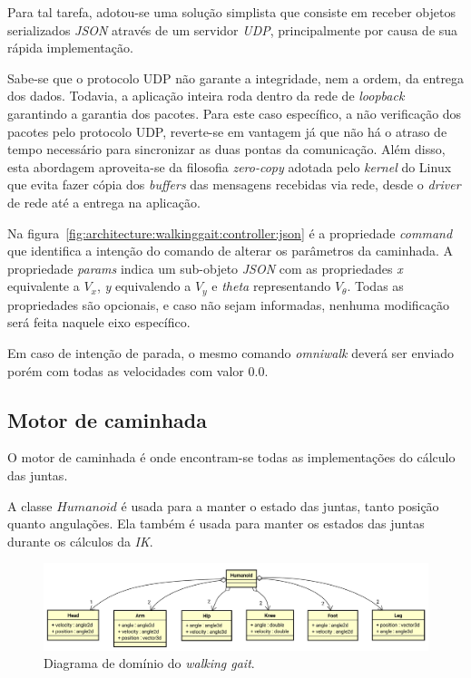 Para tal tarefa, adotou-se uma solução simplista que consiste em receber objetos serializados \textit{JSON} através de um servidor \textit{UDP}, principalmente por causa de sua rápida implementação.

Sabe-se que o protocolo UDP não garante a integridade, nem a ordem, da entrega dos dados. Todavia, a aplicação inteira roda dentro da rede de \textit{loopback} garantindo a garantia dos pacotes. Para este caso específico, a não verificação dos pacotes pelo protocolo UDP, reverte-se em vantagem já que não há o atraso de tempo necessário para sincronizar as duas pontas da comunicação. Além disso, esta abordagem aproveita-se da filosofia \textit{zero-copy} adotada pelo \textit{kernel} do Linux \cite{tianhua2008} que evita fazer cópia dos \textit{buffers} das mensagens recebidas via rede, desde o \textit{driver} de rede até a entrega na aplicação.

Na figura~\ref{fig:architecture:walkinggait:controller:json} é a propriedade \textit{command} que identifica a intenção do comando de alterar os parâmetros da caminhada. A propriedade \textit{params} indica um sub-objeto \textit{JSON} com as propriedades \textit{x} equivalente a $V_x$, \textit{y} equivalendo a $V_y$ e \textit{theta} representando $V_\theta$. Todas as propriedades são opcionais, e caso não sejam informadas, nenhuma modificação será feita naquele eixo específico.

Em caso de intenção de parada, o mesmo comando \textit{omniwalk} deverá ser enviado porém com todas as velocidades com valor $0.0$.

\subsection{Motor de caminhada}

O motor de caminhada é onde encontram-se todas as implementações do cálculo das juntas.

A classe $Humanoid$ é usada para a manter o estado das juntas, tanto posição quanto angulações. Ela também é usada para manter os estados das juntas durante os cálculos da \textit{IK}.

\begin{figure}[htb]
	\centering
	\includegraphics[scale=0.4]{imagens/svg/walkinggait-domain}
	\caption{Diagrama de domínio do \textit{walking gait}.}
	\label{fig:architecture:walkinggait:domain}
\end{figure}

